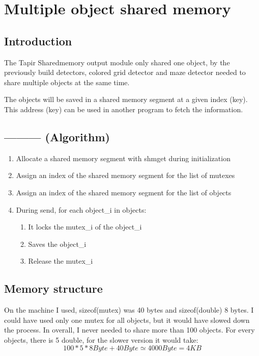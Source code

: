 \section{Multiple object shared memory}

\subsection{Introduction}

The Tapir Sharedmemory output module only shared one object, by the 
previously build detectors, colored grid detector and maze detector 
needed to share multiple objects at the same time. 

The objects will be saved in a shared memory segment at a given index 
(key). This address (key) can be used in another program to fetch the 
information.

\subsection{--------- (Algorithm)}
    \begin{enumerate}
        \item Allocate a shared memory segment with shmget during 
            initialization
        \item Assign an index of the shared memory segment for the list 
            of mutexes 
        \item Assign an index of the shared memory segment for the list 
            of objects 
        \item During send, for each object\_i in objects:
        \begin{enumerate}
            \item It locks the mutex\_i of the object\_i
            \item Saves the object\_i
            \item Release the mutex\_i
        \end{enumerate}
    \end{enumerate}

\subsection{Memory structure}

On the machine I used, sizeof(mutex) was 40 bytes and sizeof(double) 8 
bytes. I could have used only one mutex for all objects, but it would 
have slowed down the process. In overall, I never needed to share more 
than 100 objects. For every objects, there is 5 double, for the slower 
version it would take:
\begin{displaymath}
                100 * 5 * 8Byte +40Byte \simeq 4000 Byte = 4 KB 
\end{displaymath}

